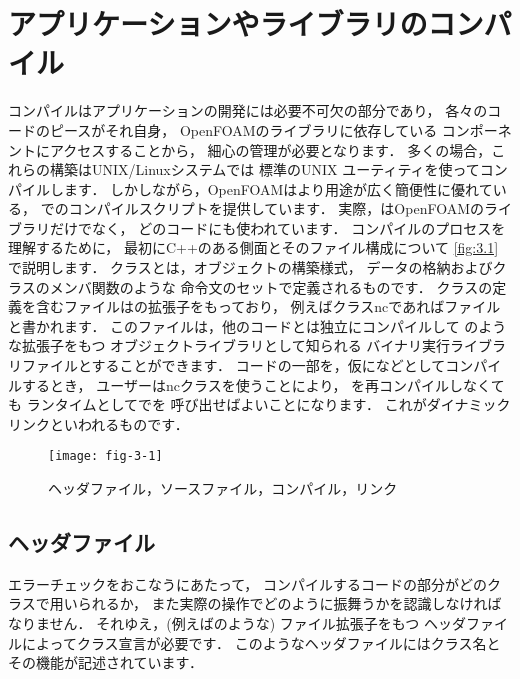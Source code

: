 \section{アプリケーションやライブラリのコンパイル}
\label{sec:3.2}
コンパイルはアプリケーションの開発には必要不可欠の部分であり，
各々のコードのピースがそれ自身，
OpenFOAMのライブラリに依存している
コンポーネントにアクセスすることから，
細心の管理が必要となります．
多くの場合，これらの構築はUNIX/Linuxシステムでは
標準のUNIX
%
%
ユーティティを使ってコンパイルします．
しかしながら，OpenFOAMはより用途が広く簡便性に優れている，
%
%
でのコンパイルスクリプトを提供しています．
実際，はOpenFOAMのライブラリだけでなく，
どのコードにも使われています．
コンパイルのプロセスを理解するために，
最初にC++のある側面とそのファイル構成について
\autoref{fig:3.1}で説明します．
クラスとは，オブジェクトの構築様式，
データの格納およびクラスのメンバ関数のような
命令文のセットで定義されるものです．
クラスの定義を含むファイルはの拡張子をもっており，
例えばクラスncであればファイルと書かれます．
このファイルは，他のコードとは独立にコンパイルして
のような拡張子をもつ
オブジェクトライブラリとして知られる
バイナリ実行ライブラリファイルとすることができます．
コードの一部を，仮になどとしてコンパイルするとき，
ユーザーはncクラスを使うことにより，
を再コンパイルしなくても
ランタイムとしてでを
呼び出せばよいことになります．
これがダイナミックリンクといわれるものです．


\begin{figure}[ht]
 \texttt{[image: fig-3-1]}
 \caption{ヘッダファイル，ソースファイル，コンパイル，リンク}
 \label{fig:3.1}
\end{figure}


\subsection{ヘッダファイル}
\label{ssec:3.2.1}
エラーチェックをおこなうにあたって，
コンパイルするコードの部分がどのクラスで用いられるか，
また実際の操作でどのように振舞うかを認識しなければなりません．
それゆえ，(例えばのような) ファイル拡張子をもつ
ヘッダファイルによってクラス宣言が必要です．
このようなヘッダファイルにはクラス名とその機能が記述されています．

